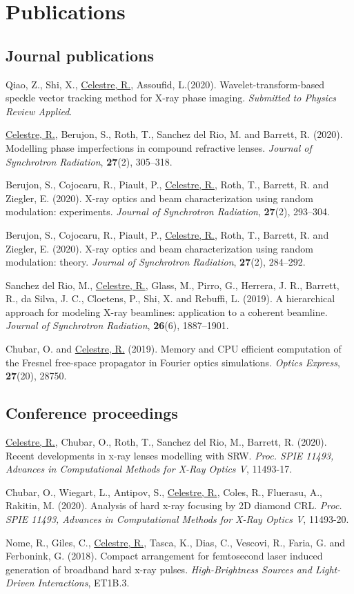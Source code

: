 \appendix

\chapter{Publications}\label{sec:publications}

\section*{Journal publications}

Qiao, Z., Shi, X., \underline{Celestre, R.}, Assoufid, L.(2020). Wavelet-transform-based speckle vector tracking method for X-ray phase imaging. \textit{Submitted to Physics Review Applied}. 

\underline{Celestre, R.}, Berujon, S., Roth, T., Sanchez del Rio, M. and Barrett, R. (2020). Modelling phase imperfections in compound refractive lenses. \textit{Journal of Synchrotron Radiation}, \textbf{27}(2), 305–318. 

Berujon, S., Cojocaru, R., Piault, P., \underline{Celestre, R.}, Roth, T., Barrett, R. and Ziegler, E. (2020). X-ray optics and beam characterization using random modulation: experiments. \textit{Journal of Synchrotron Radiation}, \textbf{27}(2), 293–304.

Berujon, S., Cojocaru, R., Piault, P., \underline{Celestre, R.}, Roth, T., Barrett, R. and Ziegler, E. (2020). X-ray optics and beam characterization using random modulation: theory. \textit{Journal of Synchrotron Radiation}, \textbf{27}(2), 284–292.

Sanchez del Rio, M., \underline{Celestre, R.}, Glass, M., Pirro, G., Herrera, J. R., Barrett, R., da Silva, J. C., Cloetens, P., Shi, X. and Rebuffi, L. (2019). A hierarchical approach for modeling X-ray beamlines: application to a coherent beamline. \textit{Journal of Synchrotron Radiation}, \textbf{26}(6), 1887–1901.

Chubar, O. and \underline{Celestre, R.} (2019). Memory and CPU efficient computation of the Fresnel free-space propagator in Fourier optics simulations. \textit{Optics Express}, \textbf{27}(20), 28750. 

\section*{Conference proceedings}

\underline{Celestre, R.}, Chubar, O., Roth, T., Sanchez del Rio, M., Barrett, R. (2020). Recent developments in x-ray lenses modelling with SRW. \textit{Proc. SPIE 11493, Advances in Computational Methods for X-Ray Optics V}, 11493-17.

Chubar, O., Wiegart, L., Antipov, S., \underline{Celestre, R.}, Coles, R., Fluerasu, A., Rakitin, M. (2020).  Analysis of hard x-ray focusing by 2D diamond CRL. \textit{Proc. SPIE 11493, Advances in Computational Methods for X-Ray Optics V}, 11493-20.

Nome, R., Giles, C., \underline{Celestre, R.}, Tasca, K., Dias, C., Vescovi, R., Faria, G. and Ferbonink, G. (2018). Compact arrangement for femtosecond laser induced generation of broadband hard x-ray pulses. \textit{High-Brightness Sources and Light-Driven Interactions}, ET1B.3.

